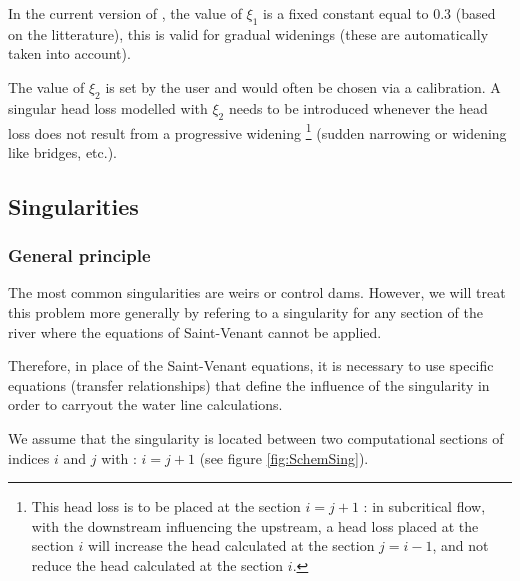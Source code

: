 In the current version of \mascaret{}, the value of $\xi_1$ is a fixed constant equal to 0.3 (based on the litterature), this is valid for gradual widenings (these are automatically taken into account).

The value of $\xi_2$ is set by the user and would often be chosen via a calibration.
A singular head loss modelled with $\xi_2$ needs to be introduced whenever the head loss does not result from a progressive widening
\footnote{This head loss is to be placed at the section $i = j + 1$ : in subcritical flow, with the downstream influencing the upstream, a head loss placed at the section $i$ will increase the head calculated at the section $j = i - 1$, and not reduce the head calculated at the section $i$.}
(sudden narrowing or widening like bridges, etc.).

\subsection{Singularities} \label{singu}

\subsubsection{General principle}

The most common singularities are weirs or control dams. However, we will treat this problem more generally by refering to a singularity for any section of the river where the equations of Saint-Venant cannot be applied.

Therefore, in place of the Saint-Venant equations, it is necessary to use specific equations (transfer relationships) that define the influence of the singularity in order to carryout the water line calculations.

We assume that the singularity is located between two computational sections of indices $i$ and $j$ with : $i = j + 1$ (see figure \ref{fig:SchemSing}).

